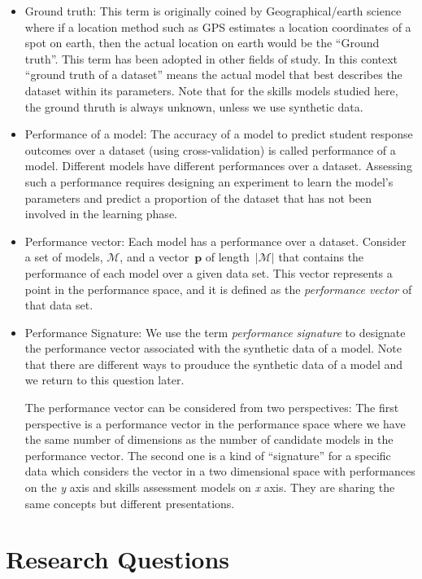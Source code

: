 \begin{itemize}
\item Ground truth: This term is originally coined by Geographical/earth science where if a location method such as GPS estimates a location coordinates of a spot on earth, then the actual location on earth would be the ``Ground truth''. This term has been adopted in other fields of study. In this context ``ground truth of a dataset'' means the actual model that best describes the dataset within its parameters.  Note that for the skills models studied here, the ground thruth is always unknown, unless we use synthetic data.
\item Performance of a model: The accuracy of a model to predict student response outcomes over a dataset (using cross-validation) is called performance of a model.  Different models have different performances over a dataset. Assessing such a performance requires designing an experiment to learn the model's parameters and predict a proportion of the dataset that has not been involved in the learning phase.
\item Performance vector: Each model has a performance over a dataset. Consider a set of models, $\mathcal{M}$, and a vector~$\mathbf{p}$ of length~$|\mathcal{M}|$ that contains the performance of each model over a given data set.  This vector represents a point in the performance space, and it is defined as the \textit{performance vector} of that data set.
\item Performance Signature: We use the term \textit{performance signature} to designate the performance vector associated with the synthetic data of a model.  Note that there are different ways to prouduce the synthetic data of a model and we return to this question later.

The performance vector can be considered from two perspectives: The first perspective is a performance vector in the performance space where we have the same number of dimensions as the number of candidate models in the performance vector. The second one is a kind of ``signature'' for a specific data which considers the vector in a two dimensional space with performances on the \textit{y} axis and skills assessment models on \textit{x} axis.  They are sharing the same concepts but different presentations. 




\end{itemize}

\section{Research Questions}
